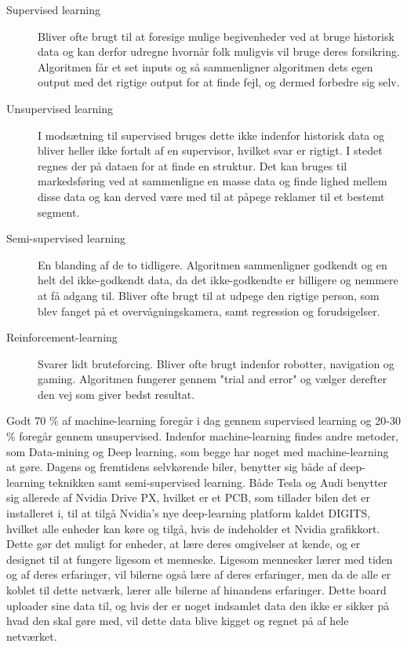	\begin{description}
		\item[Supervised learning] Bliver ofte brugt til at foresige mulige begivenheder ved at bruge historisk data og kan derfor udregne hvornår folk muligvis vil bruge deres forsikring. Algoritmen får et set inputs og så sammenligner algoritmen dets egen output med det rigtige output for at finde fejl, og dermed forbedre sig selv.
		\item[Unsupervised learning] I modsætning til supervised bruges dette ikke indenfor historisk data og bliver heller ikke fortalt af en supervisor, hvilket svar er rigtigt. I stedet regnes der på dataen for at finde en struktur. Det kan bruges til markedsføring ved at sammenligne en masse data og finde lighed mellem disse data og kan derved være med til at påpege reklamer til et bestemt segment.
		\item[Semi-supervised learning] En blanding af de to tidligere. Algoritmen sammenligner godkendt og en helt del ikke-godkendt data, da det ikke-godkendte er billigere og nemmere at få adgang til. Bliver ofte brugt til at udpege den rigtige person, som blev fanget på et overvågningskamera, samt regression og forudsigelser.
		\item[Reinforcement-learning] Svarer lidt bruteforcing. Bliver ofte brugt indenfor robotter, navigation og gaming. Algoritmen fungerer gennem "trial and error" og vælger derefter den vej som giver bedst resultat.
	\end{description}
Godt 70 \% af machine-learning foregår i dag gennem supervised learning og 20-30 \% foregår gennem unsupervised. Indenfor machine-learning findes andre metoder, som Data-mining og Deep learning, som begge har noget med machine-learning at gøre. Dagens og fremtidens selvkørende biler, benytter sig både af deep-learning teknikken samt semi-supervised learning\cite{Musk}. Både Tesla og Audi benytter sig allerede af Nvidia Drive PX, hvilket er et PCB, som tillader bilen det er installeret i, til at tilgå Nvidia's nye deep-learning platform kaldet DIGITS, hvilket alle enheder kan køre og tilgå, hvis de indeholder et Nvidia grafikkort. Dette gør det muligt for enheder, at lære deres omgivelser at kende, og er designet til at fungere ligesom et menneske. Ligesom mennesker lærer med tiden og af deres erfaringer, vil bilerne også lære af deres erfaringer, men da de alle er koblet til dette netværk, lærer alle bilerne af hinandens erfaringer\cite{Nvidia}. Dette board uploader sine data til, og hvis der er noget indsamlet data den ikke er sikker på hvad den skal gøre med, vil dette data blive kigget og regnet på af hele netværket.

